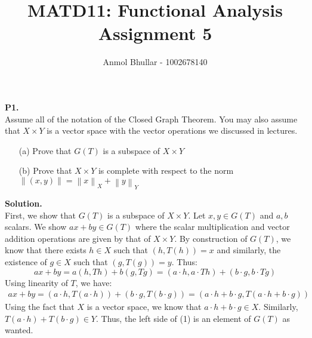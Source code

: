 \documentclass{article}
\title{MATD11: Functional Analysis\\
    Assignment 5}
\author{Anmol Bhullar - 1002678140}
\newcommand{\norm}[1]{\left\lVert#1\right\rVert}
\begin{document}
    \maketitle

    \textbf{P1.}\\

    Assume all of the notation of the Closed Graph Theorem. You may also assume that $X\times Y$ is a vector space with the vector operations we discussed
    in lectures.
    \begin{enumerate}
        \item[(a)] Prove that $G(T)$ is a subspace of $X\times Y$
        \item[(b)] Prove that $X\times Y$ is complete with respect to the norm $\norm{(x,y)} = \norm{x}_X + \norm{y}_Y$
    \end{enumerate}

    \textbf{Solution.}\\

    First, we show that $G(T)$ is a subspace of $X\times Y$. Let $x,y\in G(T)$ and $a,b$ scalars. We show $ax+by\in G(T)$ where the scalar multiplication and
    vector addition operations are given by that of $X\times Y$. By construction of $G(T)$, we know that there exists $h\in X$ such that $(h,T(h))=x$ and similarly,
    the existence of $g\in X$ such that $(g,T(g))=y$. Thus:
    \[ ax+by = a(h,Th) + b(g,Tg) = (a\cdot h, a\cdot Th) + (b\cdot g,b\cdot Tg) \]
    Using linearity of $T$, we have:
    \begin{align}
        ax+by = (a\cdot h, T(a\cdot h)) + (b\cdot g, T(b\cdot g)) = (a\cdot h + b\cdot g, T(a\cdot h + b\cdot g))
    \end{align}
    Using the fact that $X$ is a vector space, we know that $a\cdot h + b\cdot g\in X$. Similarly, $T(a\cdot h) + T(b\cdot g)\in Y$.
    Thus, the left side of (1) is an element of $G(T)$ as wanted.\\
\end{document}
